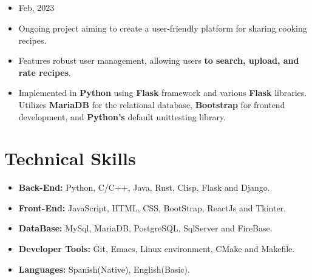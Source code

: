 \documentclass[11pt]{article}
\begin{document}
\subsection*{\href{https://github.com/alecksandr26/recipe-app-web}{\color{blue}{Cooking Recipes Web App:}}}
\vspace{-0.3cm}
\begin{itemize}[noitemsep, nolistsep]
\item Feb, 2023
\item Ongoing project aiming to create a user-friendly platform for sharing cooking recipes.
\item Features robust user management, allowing users \textbf{to search, upload, and rate recipes}.
\item Implemented in \textbf{Python} using \textbf{Flask} framework and various \textbf{Flask} libraries.
  Utilizes \textbf{MariaDB} for the relational database,
  \textbf{Bootstrap} for frontend development, and \textbf{Python's} default unittesting library.
\end{itemize}

\vspace{-0.5cm}
\section*{Technical Skills}
\vspace{-0.3cm}
\titlerule[0.3pt]
\vspace{0.1cm}

\begin{itemize}[noitemsep, nolistsep]
\item \textbf{Back-End:} Python, C/C++, Java, Rust, Clisp, Flask and Django.
\item \textbf{Front-End:} JavaScript, HTML, CSS, BootStrap, ReactJs and Tkinter.
\item \textbf{DataBase:} MySql, MariaDB, PostgreSQL, SqlServer and FireBase.
\item \textbf{Developer Tools:} Git, Emacs, Linux environment, CMake and Makefile.
\item \textbf{Languages:} Spanish(Native), English(Basic).
\end{itemize}
\vspace{-0.3cm}
\end{document}
